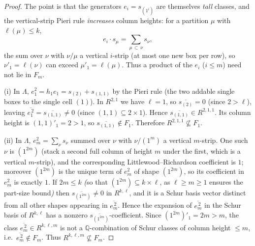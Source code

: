 \documentclass{amsart}
\theoremstyle{definition}
\newcommand{\Q}{\mathbb{Q}}
\newcommand{\rkl}{R^{k,\ell}}
\newcommand{\Rklm}{R^{k,\ell,m}}
\begin{document}
\begin{proof}
The point is that the generators $e_i=s_{(1^i)}$ are themselves \emph{tall} classes,
and the vertical-strip Pieri rule \emph{increases} column heights: for a partition
$\mu$ with $\ell(\mu)\le k$,
\[
e_i\cdot s_\mu=\sum_{\mu\,\subset\,\nu}s_\nu ,
\]
the sum over $\nu$ with $\nu/\mu$ a vertical $i$-strip (at most one new box per row),
so $\nu'_1=\ell(\nu)$ can exceed $\mu'_1=\ell(\mu)$. Thus a product of the $e_i$
($i\le m$) need not lie in $F_m$.

(i) In $\Lambda$, $e_1^2=h_1 e_1=s_{(2)}+s_{(1,1)}$ by the Pieri rule (the two
addable single boxes to the single cell $(1)$). In $R^{2,1}$ we have $\ell=1$, so
$\overline{s_{(2)}}=0$ (since $2>\ell$), leaving
$\overline{e_1^{\,2}}=\overline{s_{(1,1)}}\neq0$ (since $(1,1)\subseteq2\times1$).
Hence $\overline{s_{(1,1)}}\in R^{2,1,1}$. Its column height is $(1,1)'_1=2>1$, so
$\overline{s_{(1,1)}}\notin F_1$. Therefore $R^{2,1,1}\not\subseteq F_1$.

(ii) In $\Lambda$, $e_m^2=\sum_\nu s_\nu$ summed over $\nu$ with $\nu/(1^m)$ a
vertical $m$-strip. One such $\nu$ is $(1^{2m})$ (stack a second full column of
height $m$ under the first, which is a vertical $m$-strip), and the corresponding
Littlewood--Richardson coefficient is $1$; moreover $(1^{2m})$ is the unique term of
$e_m^2$ of shape $(1^{2m})$, so its coefficient in $e_m^2$ is exactly $1$. If
$2m\le k$ \emph{(}so that $(1^{2m})\subseteq k\times\ell$, as $\ell\ge m\ge1$
ensures the part-size bound\emph{)} then $\overline{s_{(1^{2m})}}\neq0$ in $\rkl$, and it is a Schur
basis vector distinct from all other shapes appearing in $\overline{e_m^{\,2}}$.
Hence the expansion of $\overline{e_m^{\,2}}$ in the Schur basis of $\rkl$ has a
nonzero $\overline{s_{(1^{2m})}}$-coefficient. Since $(1^{2m})'_1=2m>m$, the class
$\overline{e_m^{\,2}}\in\Rklm$ is not a $\Q$-combination of Schur classes of column
height $\le m$, i.e.\ $\overline{e_m^{\,2}}\notin F_m$. Thus
$\Rklm\not\subseteq F_m$.
\end{proof}
\end{document}
